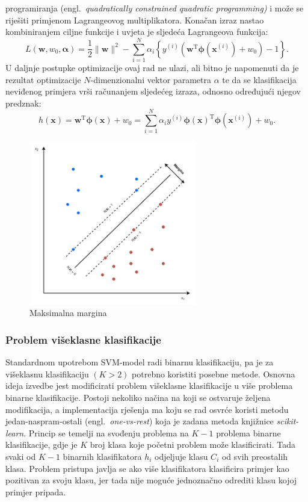 \documentclass[times, utf8, zavrsni]{fer}
\begin{document}
programiranja (engl.~\emph{quadratically constrained quadratic programming)} i može se riješiti primjenom Lagrangeovog multiplikatora. Konačan izraz nastao kombiniranjem ciljne funkcije i uvjeta je sljedeća Lagrangeova funkcija: \[ L\left(\mathbf{w}, w_{0}, \boldsymbol{\alpha}\right)=\frac{1}{2}\|\mathbf{w}\|^{2}-\sum_{i=1}^{N} \alpha_{i}\left\{y^{(i)}\left(\mathbf{w}^{\mathrm{T}} \boldsymbol{\phi}\left(\mathbf{x}^{(i)}\right)+w_{0}\right)-1\right\} .\] U daljnje postupke optimizacije ovaj rad ne ulazi, ali bitno je napomenuti da je rezultat optimizacije $N$-dimenzionalni vektor parametra $\alpha$ te da se klasifikacija neviđenog primjera vrši računanjem sljedećeg izraza, odnosno određujući njegov predznak: \[ h(\mathbf{x})=\mathbf{w}^{\mathrm{T}} \boldsymbol{\phi}(\mathbf{x})+w_{0}=\sum_{i=1}^{N} \alpha_{i} y^{(i)} \boldsymbol{\phi}(\mathbf{x})^{\mathrm{T}} \boldsymbol{\phi}\left(\mathbf{x}^{(i)}\right)+w_{0}. \]

\begin{figure}
	\centering
	\includegraphics[width=0.65\textwidth]{svm2}
	\caption{Maksimalna margina }
	\label{svm_pic}
\end{figure}

\subsubsection{Problem višeklasne klasifikacije}

Standardnom upotrebom \gls{SVM}-model radi binarnu klasifikaciju, pa je za višeklasnu klasifikaciju $\left(K > 2\right)$ potrebno koristiti posebne metode. Osnovna ideja izvedbe jest modificirati problem višeklasne klasifikacije u više problema binarne klasifikacije. Postoji nekoliko načina na koji se ostvaruje željena modifikacija, a implementacija rješenja ma koju se rad osvrće koristi metodu jedan-naspram-ostali (engl.~\emph{one-vs-rest}) koja je zadana metoda knjižnice \emph{scikit-learn}. Princip se temelji na svođenju problema na $K - 1$ problema binarne klasifikacije, gdje je $K$ broj klasa koje početni problem može klasificirati. Tada svaki od $K-1$ binarnih klasifikatora $h_i$ odjeljuje klasu $C_i$ od svih preostalih klasa. Problem pristupa javlja se ako više klasifikatora klasificira primjer kao pozitivan za svoju klasu, jer tada nije moguće jednoznačno odrediti klasu kojoj primjer pripada.
\end{document}
